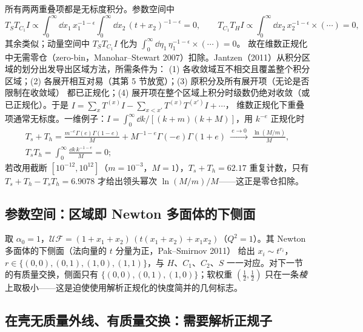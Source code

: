 所有两两重叠项都是无标度积分。参数空间中
\[
T_ST_{C_1}I\propto\int_0^\infty\!\dd x_1\,x_1^{-1-\epsilon}\int_0^\infty\!\dd x_2\,(t+x_2)^{-1-\epsilon}=0,\qquad
T_{C_1}T_HI\propto\int_0^\infty\!\dd x_2\,x_2^{-1-\epsilon}\times(\cdots)=0,
\]
其余类似；动量空间中 $T_ST_{C_1}I$ 化为 $\int_0^\infty\dd\eta_1\,\eta_1^{-1-\epsilon}\times(\cdots)=0$。
故在维数正规化中无需零仓（zero-bin，Manohar--Stewart 2007）扣除。Jantzen（2011）从积分区域的划分出发导出区域方法，所需条件为：
(1) 各收敛域互不相交且覆盖整个积分区域；(2) 各展开相互对易（其第 5 节放宽）；(3) 原积分及所有展开项（无论是否限制在收敛域）
都已正规化；(4) 展开项在整个区域上积分时级数仍绝对收敛（或已正规化）。于是 $I=\sum_xT^{(x)}I-\sum_{x<x'}T^{(x)}T^{(x')}I+\cdots$，
维数正规化下重叠项通常无标度。一维例子：$I=\int_0^\infty\dd k/[(k+m)(k+M)]$，用 $k^{-e}$ 正规化时
\begin{gather*}
T_s+T_h=\frac{m^{-e}\Gamma(e)\Gamma(1-e)}{M}+M^{-1-e}\Gamma(-e)\Gamma(1+e)\ \xrightarrow{\ e\to0\ }\ \frac{\ln(M/m)}M,\\
T_sT_h=\int_0^\infty\frac{\dd k\,k^{-1-e}}{M}=0 ;
\end{gather*}
若改用截断 $[10^{-12},10^{12}]$（$m=10^{-3}$，$M=1$），$T_s+T_h=62.17$ 重复计数，只有 $T_s+T_h-T_sT_h=6.9078$ 才给出领头幂次 $\ln(M/m)/M$——这正是零仓扣除。

\subsection{参数空间：区域即 Newton 多面体的下侧面}

取 $\alpha_0=1$，$\mathcal U\mathcal F=(1+x_1+x_2)\,(t(x_1+x_2)+x_1x_2)$（$Q^2=1$）。其 Newton 多面体的下侧面（法向量的 $t$ 分量为正，Pak--Smirnov 2011）
给出 $x_i\sim t^{r_i}$，$r\in\{(0,0),(0,1),(1,0),(1,1)\}$，与 $H$、$C_1$、$C_2$、$S$ 一一对应。对下一节的有质量交换，侧面只有
$\{(0,0),(0,1),(1,0)\}$；软权重 $(\frac12,\frac12)$ 只在一条\emph{棱}上取极小——这是迫使使用解析正规化的快度简并的几何标志。

\subsection{在壳无质量外线、有质量交换：需要解析正规子}

